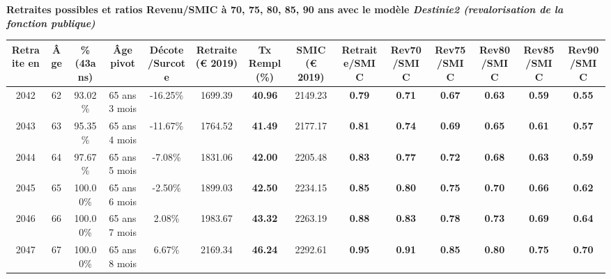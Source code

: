  \vspace{0.1cm} 
{\bf \noindent Retraites possibles et ratios Revenu/SMIC à 70, 75, 80, 85, 90 ans avec le modèle \emph{Destinie2 (revalorisation de la fonction publique)}}  
 
\begin{adjustbox}{max width=\textwidth} 
\begin{tabular}[htb]{|c|c||c|c|c||c|c||c||c|c|c|c|c|c|} 
\hline 
 Retraite en &  Âge &  \%(43ans) &  Âge pivot &  Décote/Surcote &  Retraite (\euro{} 2019) &  Tx Rempl(\%) &  SMIC (\euro{} 2019) &  Retraite/SMIC &  Rev70/SMIC &  Rev75/SMIC &  Rev80/SMIC &  Rev85/SMIC &  Rev90/SMIC \\ 
\hline \hline 
 2042 &  62 &  93.02\% &  65 ans 3 mois &  -16.25\% &  1699.39 &  {\bf 40.96} &  2149.23 &  {\bf {\color{red} 0.79}} &  {\bf {\color{red} 0.71}} &  {\bf {\color{red} 0.67}} &  {\bf {\color{red} 0.63}} &  {\bf {\color{red} 0.59}} &  {\bf {\color{red} 0.55}} \\ 
\hline 
 2043 &  63 &  95.35\% &  65 ans 4 mois &  -11.67\% &  1764.52 &  {\bf 41.49} &  2177.17 &  {\bf {\color{red} 0.81}} &  {\bf {\color{red} 0.74}} &  {\bf {\color{red} 0.69}} &  {\bf {\color{red} 0.65}} &  {\bf {\color{red} 0.61}} &  {\bf {\color{red} 0.57}} \\ 
\hline 
 2044 &  64 &  97.67\% &  65 ans 5 mois &  -7.08\% &  1831.06 &  {\bf 42.00} &  2205.48 &  {\bf {\color{red} 0.83}} &  {\bf {\color{red} 0.77}} &  {\bf {\color{red} 0.72}} &  {\bf {\color{red} 0.68}} &  {\bf {\color{red} 0.63}} &  {\bf {\color{red} 0.59}} \\ 
\hline 
 2045 &  65 &  100.00\% &  65 ans 6 mois &  -2.50\% &  1899.03 &  {\bf 42.50} &  2234.15 &  {\bf {\color{red} 0.85}} &  {\bf {\color{red} 0.80}} &  {\bf {\color{red} 0.75}} &  {\bf {\color{red} 0.70}} &  {\bf {\color{red} 0.66}} &  {\bf {\color{red} 0.62}} \\ 
\hline 
 2046 &  66 &  100.00\% &  65 ans 7 mois &  2.08\% &  1983.67 &  {\bf 43.32} &  2263.19 &  {\bf {\color{red} 0.88}} &  {\bf {\color{red} 0.83}} &  {\bf {\color{red} 0.78}} &  {\bf {\color{red} 0.73}} &  {\bf {\color{red} 0.69}} &  {\bf {\color{red} 0.64}} \\ 
\hline 
 2047 &  67 &  100.00\% &  65 ans 8 mois &  6.67\% &  2169.34 &  {\bf 46.24} &  2292.61 &  {\bf {\color{red} 0.95}} &  {\bf {\color{red} 0.91}} &  {\bf {\color{red} 0.85}} &  {\bf {\color{red} 0.80}} &  {\bf {\color{red} 0.75}} &  {\bf {\color{red} 0.70}} \\ 
\hline 
\hline 
\end{tabular} 
\end{adjustbox} 
 
